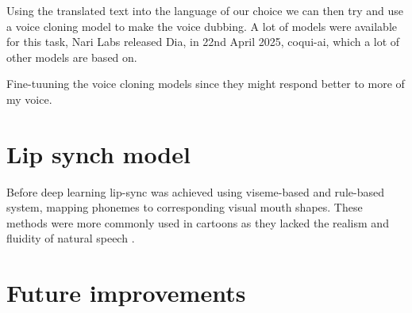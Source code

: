 \documentclass[12pt]{article}
\begin{document}
Using the translated text into the language of our choice we can then try and use a voice cloning model to make the voice dubbing. A lot of models were available for this task, Nari Labs released Dia, in 22nd April 2025, coqui-ai, which a lot of other models are based on. 


Fine-tuuning the voice cloning models since they might respond better to more of my voice.

\section{Lip synch model}
Before deep learning lip-sync was achieved using viseme-based and rule-based system, mapping phonemes to corresponding visual mouth shapes. These methods were more commonly used in cartoons as they lacked the realism and fluidity of natural speech \cite{automatic-lip-synch-methods-in-games}\cite{https://doi.org/10.1002/vis.4340020404}\cite{computers14010007}. 

\section{Future improvements}
\end{document}
